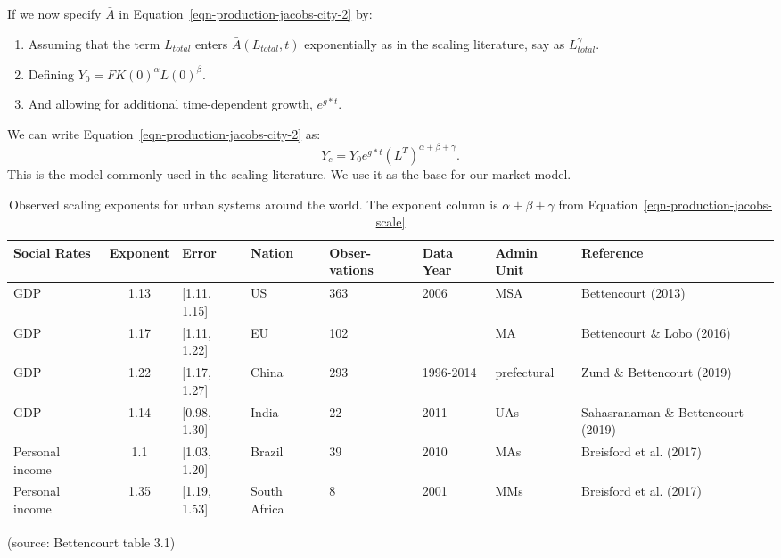 If we now specify $\bar A$ in Equation~\ref{eqn-production-jacobs-city-2} by: \begin{enumerate}
    \item   Assuming that the term $L_{total}$ enters $\bar A(L_{total}, t)$ exponentially as in the scaling literature, say as $L_{total}^\gamma$. 
    \item Defining $Y_0=F K(0)^\alpha L(0)^\beta$.
    \item And allowing  for additional time-dependent growth, $e^{g*t}$.
\end{enumerate}
We can write Equation~\ref{eqn-production-jacobs-city-2} as:
\begin{equation}Y_c = Y_0e^{g*t}(L^T)^{\alpha+\beta+\gamma}. \label{eqn-production-jacobs-scale}
\end{equation}
This is the model commonly used in the scaling literature. We use it as the base for our market model. 



\begin{table}[htb]\small
\centering
\begin{tabular}{|p{1.5cm}|c|l|p{1.25cm}|p{1.5cm}|p{}|p{1.5cm}|p{2.5cm}|}\hline
\textbf{Social Rates} & \textbf{Exponent} & \textbf{Error} & \textbf{Nation} & \textbf{Obser}\textbf{-vations} & \textbf{Data Year} & \textbf{Admin Unit} & \textbf{Reference} \\ \hline   
GDP             & 1.13 & [1.11, 1.15]  & US           & 363 & 2006        & MSA  & Bettencourt (2013)                 \\ \hline
GDP             & 1.17 & [1.11, 1.22]  & EU           & 102 &             & MA   & Bettencourt  \& Lobo        (2016) \\ \hline
GDP             & 1.22 & [1.17, 1.27]  & China        & 293 & 1996-2014   & prefectural & Zund  \& Bettencourt (2019) \\ \hline
GDP             & 1.14 & [0.98, 1.30]  & India        & 22  & 2011        & UAs  & Sahasranaman \& Bettencourt (2019) \\ \hline
Personal income & 1.1  & [1.03, 1.20]  & Brazil       & 39  & 2010        & MAs  & Breisford et al.  (2017)           \\ \hline
Personal income & 1.35 & [1.19, 1.53]  & South Africa & 8   & 2001        & MMs  & Breisford et al.  (2017)           \\ \hline
\end{tabular}
\caption[Observed scaling exponents]{Observed scaling exponents for urban systems around the world. The exponent column is $\alpha +\beta+\gamma$ from Equation~\ref{eqn-production-jacobs-scale}} \label{table-scaling-exponents}

\hfill (source: Bettencourt \cite{bettencourtIntroductionUrbanScience2021} table 3.1)
\end{table}



